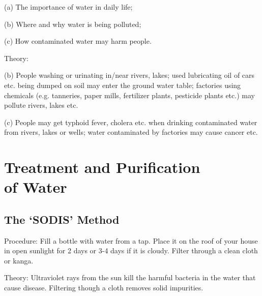 \begin{multicols}{2}
\begin{description*}
{(a) The importance of water in daily life;

(b) Where and why water is being polluted;

(c) How contaminated water may harm people.}
\item[Theory:]{(b) People washing or urinating in/near
rivers, lakes; used lubricating oil of cars etc.
being dumped on soil may enter the ground
water table; factories using chemicals (e.g.
tanneries, paper mills, fertilizer plants, pesticide
plants etc.) may pollute rivers, lakes etc.

(c) People may get typhoid fever, cholera etc.
when drinking contaminated water from rivers,
lakes or wells; water contaminated by factories
may cause cancer etc.}
\end{description*}


\section*{Treatment and Purification \hfill \\ of Water} 


\subsection{The `SODIS' Method}  %


\begin{description*}
\item[Procedure:]{Fill a bottle with water from a tap. Place it on the roof of your house in open sunlight for 2 days or 3-4 days if it is cloudy. Filter through a clean cloth or kanga.}
\item[Theory:]{Ultraviolet rays from the sun kill the harmful bacteria in the water that cause disease. Filtering though a cloth removes solid impurities.}
\end{description*}


\end{multicols}
